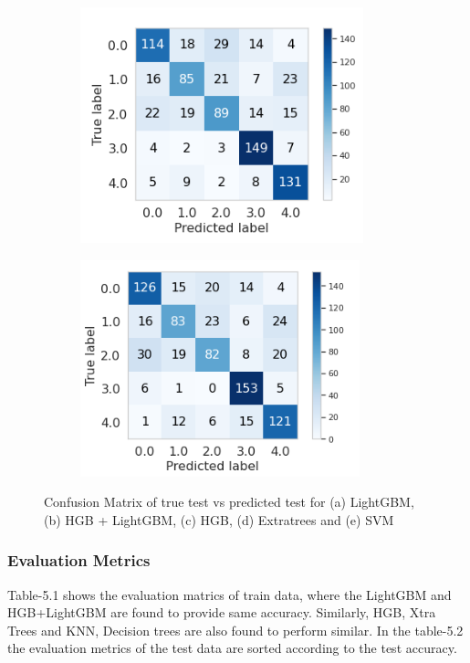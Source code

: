 \begin{figure}[H]
\begin{subfigure}{.55\textwidth}
        \caption{}
        \label{fig:sub3}
    \end{subfigure}%
    \begin{subfigure}{.55\textwidth}
        \setcounter{subfigure}{3} %
        \centering
        \includegraphics[width=.55\linewidth]{figures/xtratrees_test.png}
        \caption{}
        \label{fig:sub4}
    \end{subfigure}  
    \begin{subfigure}{.55\textwidth}
        \setcounter{subfigure}{4} %
        \centering
        \includegraphics[width=.55\linewidth]{figures/svm_test.png}
        \caption{}
        \label{fig:sub3}
    \end{subfigure}%
     \caption{Confusion Matrix of true test vs predicted test for (a) LightGBM, (b) HGB + LightGBM, (c) HGB, (d) Extratrees and (e) SVM}\label{fig:main}
\end{figure}






\subsubsection{Evaluation Metrics}
Table-5.1 shows the evaluation matrics of train data, where the LightGBM and HGB+LightGBM are found to provide same accuracy. Similarly, HGB, Xtra Trees and KNN, Decision trees are also found to perform similar. In the table-5.2 the evaluation metrics of the test data are sorted according to the test accuracy. 


